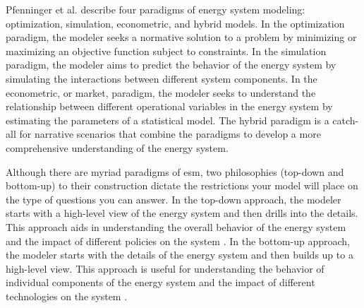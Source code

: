 Pfenninger et al. \cite{pfenninger_energy_2014} describe four
paradigms of energy system modeling: optimization, simulation, econometric, and
hybrid models. In the optimization paradigm, the modeler seeks a normative
solution to a problem by minimizing or maximizing an objective function subject
to constraints. In the simulation paradigm, the modeler aims to predict the
behavior of the energy system by simulating the interactions between different
system components. In the econometric, or market, paradigm, the modeler seeks
to understand the relationship between different operational variables in the
energy system by estimating the parameters of a statistical model. The hybrid
paradigm is a catch-all for narrative scenarios that combine the paradigms to
develop a more comprehensive understanding of the energy system.

Although there are myriad paradigms of \gls{esm}, two philosophies (top-down
and bottom-up) to their construction dictate the restrictions your model will
place on the type of questions you can answer. In the top-down approach, the
modeler starts with a high-level view of the energy system and then drills into
the details. This approach aids in understanding the overall behavior of the
energy system and the impact of different policies on the system
\cite{laha_energy_2017}. In the bottom-up approach, the modeler starts with the
details of the energy system and then builds up to a high-level view. This
approach is useful for understanding the behavior of individual components of
the energy system and the impact of different technologies on the system
\cite{ipcc_ch2_2000,laha_energy_2017}.

